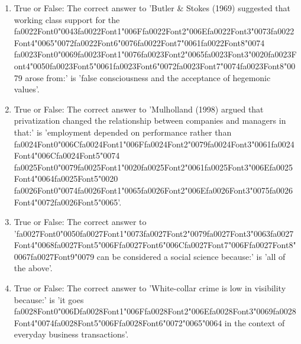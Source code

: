 \documentclass[12pt]{article}
\begin{document}
\begin{enumerate}[label=\arabic*.]
\item True or False: The correct answer to 'Butler \& Stokes (1969) suggested that working class support for the {\csname fa0022Font0\endcsname\char"0043}{\csname fa0022Font1\endcsname\char"006F}{\csname fa0022Font2\endcsname\char"006E}{\csname fa0022Font3\endcsname\char"0073}{\csname fa0022Font4\endcsname\char"0065}{\char"0072}{\csname fa0022Font6\endcsname\char"0076}{\csname fa0022Font7\endcsname\char"0061}{\csname fa0022Font8\endcsname\char"0074} {\csname fa0023Font0\endcsname\char"0069}{\csname fa0023Font1\endcsname\char"0076}{\csname fa0023Font2\endcsname\char"0065}{\csname fa0023Font3\endcsname\char"0020}{\csname fa0023Font4\endcsname\char"0050}{\csname fa0023Font5\endcsname\char"0061}{\csname fa0023Font6\endcsname\char"0072}{\csname fa0023Font7\endcsname\char"0074}{\csname fa0023Font8\endcsname\char"0079} arose from:' is 'false consciousness and the acceptance of hegemonic values'.
\item True or False: The correct answer to 'Mulholland (1998) argued that privatization changed the relationship between companies and managers in that:' is 'employment depended on performance rather than {\csname fa0024Font0\endcsname\char"006C}{\csname fa0024Font1\endcsname\char"006F}{\csname fa0024Font2\endcsname\char"0079}{\csname fa0024Font3\endcsname\char"0061}{\csname fa0024Font4\endcsname\char"006C}{\csname fa0024Font5\endcsname\char"0074} {\csname fa0025Font0\endcsname\char"0079}{\csname fa0025Font1\endcsname\char"0020}{\csname fa0025Font2\endcsname\char"0061}{\csname fa0025Font3\endcsname\char"006E}{\csname fa0025Font4\endcsname\char"0064}{\csname fa0025Font5\endcsname\char"0020} {\csname fa0026Font0\endcsname\char"0074}{\csname fa0026Font1\endcsname\char"0065}{\csname fa0026Font2\endcsname\char"006E}{\csname fa0026Font3\endcsname\char"0075}{\csname fa0026Font4\endcsname\char"0072}{\csname fa0026Font5\endcsname\char"0065}'.
\item True or False: The correct answer to '{\csname fa0027Font0\endcsname\char"0050}{\csname fa0027Font1\endcsname\char"0073}{\csname fa0027Font2\endcsname\char"0079}{\csname fa0027Font3\endcsname\char"0063}{\csname fa0027Font4\endcsname\char"0068}{\csname fa0027Font5\endcsname\char"006F}{\csname fa0027Font6\endcsname\char"006C}{\csname fa0027Font7\endcsname\char"006F}{\csname fa0027Font8\endcsname\char"0067}{\csname fa0027Font9\endcsname\char"0079} can be considered a social science because:' is 'all of the above'.
\item True or False: The correct answer to 'White-collar crime is low in visibility because:' is 'it goes {\csname fa0028Font0\endcsname\char"006D}{\csname fa0028Font1\endcsname\char"006F}{\csname fa0028Font2\endcsname\char"006E}{\csname fa0028Font3\endcsname\char"0069}{\csname fa0028Font4\endcsname\char"0074}{\csname fa0028Font5\endcsname\char"006F}{\csname fa0028Font6\endcsname\char"0072}{\char"0065}{\char"0064} in the context of everyday business transactions'.

\end{enumerate}
\end{document}
